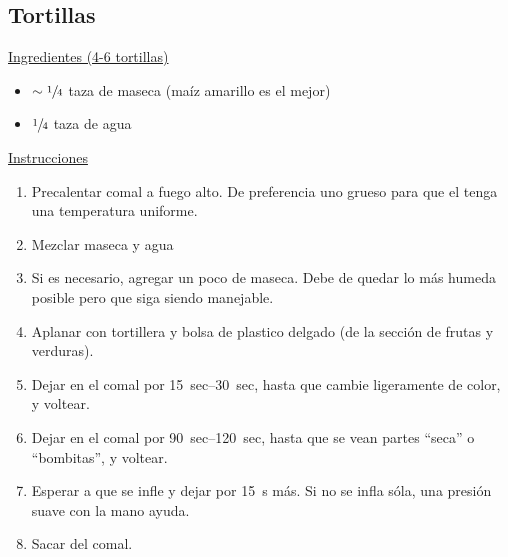 \subsection{Tortillas}

\underline{Ingredientes (4-6 tortillas)}
\begin{itemize}
\item $\sim\sfrac{1}{4}$ taza de maseca (maíz amarillo es el mejor)
\item $\sfrac{1}{4}$ taza de agua
\end{itemize}

\underline{Instrucciones}
\begin{enumerate}
\item Precalentar comal a fuego alto. De preferencia uno grueso para que el tenga una temperatura uniforme.
\item Mezclar maseca y agua
\item Si es necesario, agregar un poco de maseca. Debe de quedar lo más humeda posible pero que siga siendo manejable.
\item Aplanar con tortillera y bolsa de plastico delgado (de la sección de frutas y verduras).
\item Dejar en el comal por \SIrange{15}{30}{sec}, hasta que cambie ligeramente de color, y voltear.
\item Dejar en el comal por \SIrange{90}{120}{sec}, hasta que se vean partes ``seca'' o ``bombitas'', y voltear.
\item Esperar a que se infle y dejar por \SI{15}{s} más. Si no se infla sóla, una presión suave con la mano ayuda.
\item Sacar del comal.
\end{enumerate}

